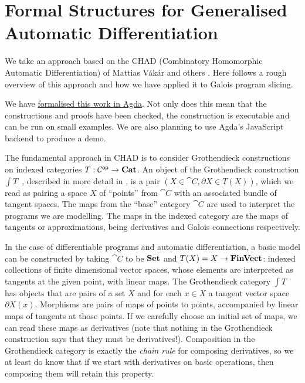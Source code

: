 \section{Formal Structures for Generalised Automatic Differentiation}


We take an approach based on the CHAD (Combinatory Homomorphic Automatic Differentiation) of Mattias Vákár and others \cite{nunes2023}. Here follows a rough overview of this approach and how we have applied it to Galois program slicing. 

We have \href{https://github.com/bobatkey/approx-diff}{formalised this work in Agda}. Not only does this mean that the constructions and proofs have been checked, the construction is executable and can be run on small examples. We are also planning to use Agda's JavaScript backend to produce a demo.

The fundamental approach in CHAD is to consider Grothendieck constructions on indexed categories $T : \mathcal{C}^{\mathsf{op}} \to \mathbf{Cat}$. An object of the Grothendieck construction $\int T$~, described in more detail in , is a pair $(X \in \cat{C}, \partial X \in T(X))$, which we read as pairing a space $X$ of ``points'' from $\cat{C}$ with an associated bundle of tangent spaces. The maps from the ``base'' category $\cat{C}$ are used to interpret the programs we are modelling. The maps in the indexed category are the maps of tangents or approximations, being derivatives and Galois connections respectively.

In the case of differentiable programs and automatic differentiation, a basic model can be constructed by taking $\cat{C}$ to be $\mathbf{Set}$ and $T(X) = X \to \mathbf{FinVect}$: indexed collections of finite dimensional vector spaces, whose elements are interpreted as tangents at the given point, with linear maps. The Grothendieck category $\int T$ has objects that are pairs of a set $X$ and for each $x \in X$ a tangent vector space $\partial X(x)$. Morphisms are pairs of maps of points to points, accompanied by linear maps of tangents at those points. If we carefully choose an initial set of maps, we can read these maps as derivatives (note that nothing in the Grothendieck construction says that they must be derivatives!). Composition in the Grothendieck category is exactly the {\em chain rule} for composing derivatives, so we at least do know that if we start with derivatives on basic operations, then composing them will retain this property.

